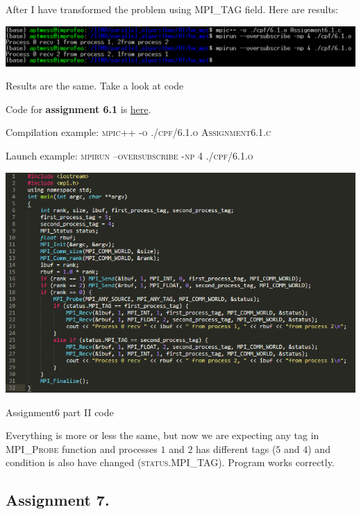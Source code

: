 \documentclass[%
12pt, %
final, %
oneside, %
onecolumn, %
centertags]{article} %
\theoremstyle{plain}
\theoremstyle{definition}
\theoremstyle{remark}
\begin{document}
After I have transformed the problem using \textsc{MPI\_TAG} field. Here are results:

\begin{center}
\includegraphics[scale=0.65]{6.2.png}

Results are the same. Take a look at code
\end{center}

Code for \textbf{assignment 6.1} is \href{https:\//github.com/aptmess/parallel_algorithms/blob/master/HT/hw_mpi/Assignment6.1.c}{here}.

Compilation example: \textsc{mpic++ -o ./cpf/6.1.o Assignment6.1.c}

Launch example: \textsc{mpirun --oversubscribe -np 4 ./cpf/6.1.o}

\begin{center}
\includegraphics[scale=0.7]{6.2.code.png}

Assignment6 part II code
\end{center}

Everything is more or less the same, but now we are expecting any tag in \textsc{MPI\_Probe} function and processes $1$ and $2$ has different tags ($5$ and $4$) and condition is also have changed (\textsc{status.MPI\_TAG}). Program works correctly.



\newpage
\subsection{Assignment 7.}
\end{document}
